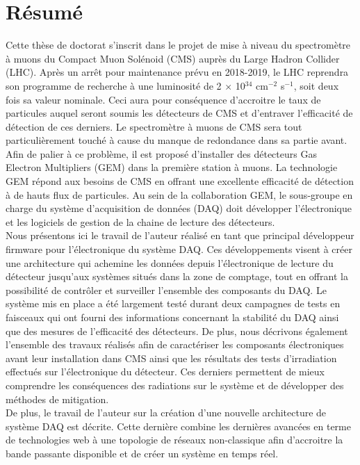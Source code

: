\chapter*{Résumé}

  Cette thèse de doctorat s'inscrit dans le projet de mise à niveau du spectromètre à muons du Compact Muon Solénoid (CMS) auprès du Large Hadron Collider (LHC). Après un arrêt pour maintenance prévu en 2018-2019, le LHC reprendra son programme de recherche à une luminosité de 2 $\times$ 10$^{34}$ cm$^{-2}$ s$^{-1}$, soit deux fois sa valeur nominale. Ceci aura pour conséquence d'accroitre le taux de particules auquel seront soumis les détecteurs de CMS et d'entraver l'efficacité de détection de ces derniers. Le spectromètre à muons de CMS sera tout particulièrement touché à cause du manque de redondance dans sa partie avant. Afin de palier à ce problème, il est proposé d'installer des détecteurs Gas Electron Multipliers (GEM) dans la première station à muons. La technologie GEM répond aux besoins de CMS en offrant une excellente efficacité de détection à de hauts flux de particules. Au sein de la collaboration GEM, le sous-groupe en charge du système d'acquisition de données (DAQ) doit développer l'électronique et les logiciels de gestion de la chaine de lecture des détecteurs. \\

  Nous présentons ici le travail de l'auteur réalisé en tant que principal développeur firmware pour l'électronique du système DAQ. Ces développements visent à créer une architecture qui achemine les données depuis l'électronique de lecture du détecteur jusqu'aux systèmes situés dans la zone de comptage, tout en offrant la possibilité de contrôler et surveiller l'ensemble des composants du DAQ. Le système mis en place a été largement testé durant deux campagnes de tests en faisceaux qui ont fourni des informations concernant la stabilité du DAQ ainsi que des mesures de l'efficacité des détecteurs. De plus, nous décrivons également l'ensemble des travaux réalisés afin de caractériser les composants électroniques avant leur installation dans CMS ainsi que les résultats des tests d'irradiation effectués sur l'électronique du détecteur. Ces derniers permettent de mieux comprendre les conséquences des radiations sur le système et de développer des méthodes de mitigation. \\

  De plus, le travail de l'auteur sur la création d'une nouvelle architecture de système DAQ est décrite. Cette dernière combine les dernières avancées en terme de technologies web à une topologie de réseaux non-classique afin d'accroitre la bande passante disponible et de créer un système en temps réel.

